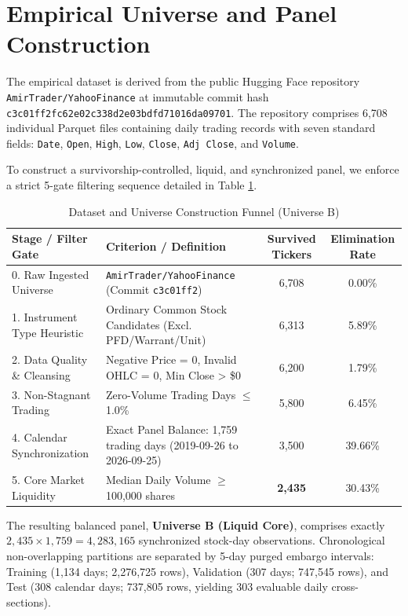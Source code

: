 \documentclass[11pt,a4paper]{article}
\begin{document}
\section{Empirical Universe and Panel Construction}
The empirical dataset is derived from the public Hugging Face repository \texttt{AmirTrader/YahooFinance} at immutable commit hash \texttt{c3c01ff2fc62e02c338d2e03bdfd71016da09701}. The repository comprises 6,708 individual Parquet files containing daily trading records with seven standard fields: \texttt{Date}, \texttt{Open}, \texttt{High}, \texttt{Low}, \texttt{Close}, \texttt{Adj Close}, and \texttt{Volume}.

To construct a survivorship-controlled, liquid, and synchronized panel, we enforce a strict 5-gate filtering sequence detailed in Table \ref{tab:universe}.

\begin{table}[H]
\centering
\small
\caption{Dataset and Universe Construction Funnel (Universe B)}
\label{tab:universe}
\begin{tabular}{llcc}
\toprule
\textbf{Stage / Filter Gate} & \textbf{Criterion / Definition} & \textbf{Survived Tickers} & \textbf{Elimination Rate} \\
\midrule
0. Raw Ingested Universe & \texttt{AmirTrader/YahooFinance} (Commit \texttt{c3c01ff2}) & 6,708 & 0.00\% \\
1. Instrument Type Heuristic & Ordinary Common Stock Candidates (Excl. PFD/Warrant/Unit) & 6,313 & 5.89\% \\
2. Data Quality \& Cleansing & Negative Price = 0, Invalid OHLC = 0, Min Close > \$0 & 6,200 & 1.79\% \\
3. Non-Stagnant Trading & Zero-Volume Trading Days $\le$ 1.0\% & 5,800 & 6.45\% \\
4. Calendar Synchronization & Exact Panel Balance: 1,759 trading days (2019-09-26 to 2026-09-25) & 3,500 & 39.66\% \\
5. Core Market Liquidity & Median Daily Volume $\ge$ 100,000 shares & \textbf{2,435} & 30.43\% \\
\bottomrule
\end{tabular}
\end{table}

The resulting balanced panel, \textbf{Universe B (Liquid Core)}, comprises exactly $2,435 \times 1,759 = 4,283,165$ synchronized stock-day observations. Chronological non-overlapping partitions are separated by 5-day purged embargo intervals: Training (1,134 days; 2,276,725 rows), Validation (307 days; 747,545 rows), and Test (308 calendar days; 737,805 rows, yielding 303 evaluable daily cross-sections).
\end{document}
